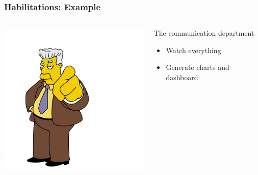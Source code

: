 \documentclass{beamer}
\begin{document}
\begin{frame}
\frametitle{Habilitations: Example}
\begin{columns}
 \begin{column}{0.45\textwidth}
         \includegraphics[height=7.5cm]{./pics/simpsons/comm_kent_brockman.jpg}
 \end{column}
 \begin{column}{0.45\textwidth}
    \begin{block}{The communication department}
        \begin{itemize}
            \item Watch everything
            \item Generate charts and dashboard 
        \end{itemize}
    \end{block}
 \end{column}
\end{columns}
\end{frame}
\end{document}
